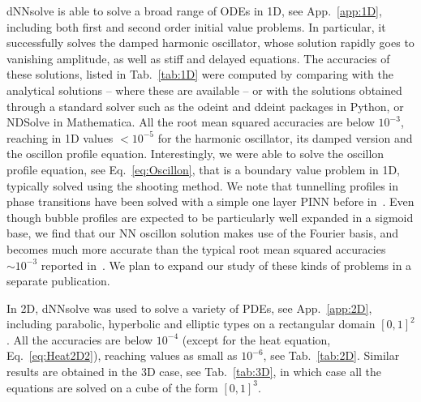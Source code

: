 \documentclass{article}
\begin{document}
\textsf{dNNsolve} is able to solve a broad range of ODEs in 1D, see App.~\ref{app:1D}, including both first and second order initial value problems. In particular, it successfully solves the damped harmonic oscillator, whose solution rapidly goes to vanishing amplitude, as well as stiff and delayed equations. The accuracies of these solutions, listed in Tab.~\ref{tab:1D} were computed by comparing with the analytical solutions -- where these are available -- or with the solutions obtained through a standard solver such as the \textsf{odeint} and \textsf{ddeint} packages in Python, or \textsf{NDSolve} in \textsf{Mathematica}. All the root mean squared accuracies are below $10^{-3}$, reaching in 1D values $< 10^{-5}$ for the harmonic oscillator, its damped version and the oscillon profile equation. Interestingly, we were able to solve the oscillon profile equation, see Eq.~\ref{eq:Oscillon}, that is a boundary value problem in 1D, typically solved using the shooting method. We note that tunnelling profiles in phase transitions have been solved with a simple one layer PINN before in~\cite{Piscopo:2019txs}. Even though bubble profiles are expected to be particularly well expanded in a sigmoid base, we find that our NN oscillon solution makes use of the Fourier basis, and becomes much more accurate than the typical root mean squared accuracies $\sim 10^{-3}$ reported in~\cite{Piscopo:2019txs}. We plan to expand our study of these kinds of problems in a separate publication.

In 2D, \textsf{dNNsolve} was used to solve a variety of PDEs, see App.~\ref{app:2D}, including parabolic, hyperbolic and elliptic types on a rectangular domain $[0,1]^2$. All the accuracies are below $10^{-4}$ (except for the heat equation, Eq.~\ref{eq:Heat2D2}), reaching values as small as $10^{-6}$, see Tab.~\ref{tab:2D}. Similar results are obtained in the 3D case, see Tab.~\ref{tab:3D}, in which case all the equations are solved on a cube of the form $[0,1]^3$.
\end{document}
